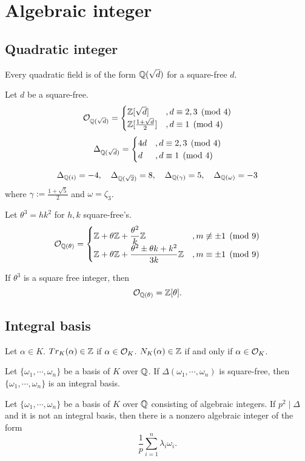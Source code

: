 \documentclass[11pt]{article}
\let\realsection\section
\renewcommand\section{\newpage\realsection}
\begin{document}
\section{Algebraic integer}
\subsection{Quadratic integer}
\begin{thm}
Every quadratic field is of the form $\mathbb{Q}(\sqrt d)$ for a square-free $d$.
\end{thm}
\begin{thm}
Let $d$ be a square-free.
\[\mathcal{O}_{\mathbb{Q}(\sqrt d)}=\begin{cases}\mathbb{Z}[\sqrt d]&,d\equiv2,3\pmod4\\\mathbb{Z}[\tfrac{1+\sqrt d}2]&,d\equiv1\pmod4\end{cases}\]
\[\Delta_{\mathbb{Q}(\sqrt d)}=\begin{cases}4d&,d\equiv2,3\pmod4\\ d&,d\equiv1\pmod4\end{cases}\]
\end{thm}
\begin{ex}
\[\Delta_{\mathbb{Q}(i)}=-4,\quad\Delta_{\mathbb{Q}(\sqrt2)}=8,\quad\Delta_{\mathbb{Q}(\gamma)}=5,\quad\Delta_{\mathbb{Q}(\omega)}=-3\]
where $\gamma:=\frac{1+\sqrt5}2$ and $\omega=\zeta_3$.
\end{ex}
\begin{thm}
Let $\theta^3=hk^2$ for $h,k$ square-free's.
\[\mathcal{O}_{\mathbb{Q}(\theta)}=\begin{cases}\displaystyle\mathbb{Z}+\theta\mathbb{Z}+\frac{\theta^2}k\mathbb{Z}&,m\not\equiv\pm1\pmod9\\
\displaystyle\mathbb{Z}+\theta\mathbb{Z}+\frac{\theta^2\pm\theta k+k^2}{3k}\mathbb{Z}&,m\equiv\pm1\pmod9\end{cases}\]
\end{thm}
\begin{cor}
If $\theta^3$ is a square free integer, then
\[\mathcal{O}_{\mathbb{Q}(\theta)}=\mathbb{Z}[\theta].\]
\end{cor}

\subsection{Integral basis}
\begin{thm}
Let $\alpha\in K$.
$Tr_K(\alpha)\in\mathbb{Z}$ if $\alpha\in\mathcal{O}_K$.
$N_K(\alpha)\in\mathbb{Z}$ if and only if $\alpha\in\mathcal{O}_K$.
\end{thm}
\begin{thm}
Let $\{\omega_1,\cdots,\omega_n\}$ be a basis of $K$ over $\mathbb{Q}$.
If $\Delta(\omega_1,\cdots,\omega_n)$ is square-free, then $\{\omega_1,\cdots,\omega_n\}$ is an integral basis.
\end{thm}
\begin{thm}
Let $\{\omega_1,\cdots,\omega_n\}$ be a basis of $K$ over $\mathbb{Q}$ consisting of algebraic integers.
If $p^2\mid\Delta$ and it is not an integral basis, then there is a nonzero algebraic integer of the form
\[\frac1p\sum_{i=1}^n\lambda_i\omega_i.\]
\end{thm}
\end{document}
